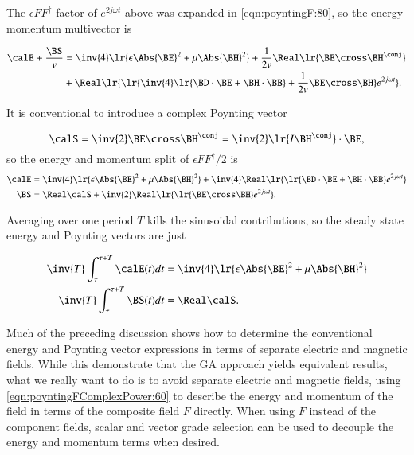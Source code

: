 The \( \epsilon F F^\dagger \) factor of \( e^{2 j \omega t} \) above was expanded in \cref{eqn:poyntingF:80}, so the energy momentum multivector is

\begin{dmath}\label{eqn:poyntingFComplexPower:220}
\begin{aligned}
\calE + \frac{\BS}{v}
&=
\inv{4} \lr{
\epsilon \Abs{\BE}^2 + \mu \Abs{\BH}^2 }
+
\frac{1}{2 v} \Real \lr{
\BE \cross \BH^\conj
} \\
&+
\Real
\lr{
   \lr{
     \inv{4} \lr{ \BD \cdot \BE + \BH \cdot \BB}
   + \frac{1}{2 v} \BE \cross \BH
   }
   e^{2 j \omega t }
}.
\end{aligned}
\end{dmath}

It is conventional to introduce a complex Poynting vector

\begin{equation}\label{eqn:poyntingFComplexPower:240}
\calS = \inv{2} \BE \cross \BH^\conj = \inv{2} \lr{ I \BH^\conj } \cdot \BE,
\end{equation}
so the energy and momentum split of \( \epsilon F F^\dagger/2 \) is
\begin{dmath}\label{eqn:poyntingFComplexPower:260}
\begin{aligned}
\calE &=
\inv{4} \lr{
\epsilon \Abs{\BE}^2 + \mu \Abs{\BH}^2 }
+
\inv{4} \Real
\lr{
   \lr{ \BD \cdot \BE + \BH \cdot \BB}
   e^{2 j \omega t }
} \\
\BS &= \Real \calS
+
\inv{2} \Real
\lr{
\lr{ \BE \cross \BH }
   e^{2 j \omega t }
}.
\end{aligned}
\end{dmath}

Averaging over one period \( T \) kills the sinusoidal contributions, so the steady state energy and Poynting vectors are just

\begin{dmath}\label{eqn:poyntingFComplexPower:280}
\begin{aligned}
\inv{T} \int_\tau^{\tau+T} \calE(t) dt &=
\inv{4} \lr{
\epsilon \Abs{\BE}^2 + \mu \Abs{\BH}^2 } \\
\inv{T} \int_\tau^{\tau+T} \BS(t) dt &= \Real \calS.
\end{aligned}
\end{dmath}

Much of the preceding discussion shows how to determine the conventional energy and Poynting vector expressions in terms of separate electric and magnetic fields.
While this demonstrate that the GA approach yields equivalent results, what we really want to do is to
avoid separate electric and magnetic fields, using
\cref{eqn:poyntingFComplexPower:60} to describe the energy and momentum of the field in terms of the composite field \( F \) directly.
When using \( F \) instead of the component fields,
scalar and vector grade selection can be used to decouple the energy and momentum terms when desired.
